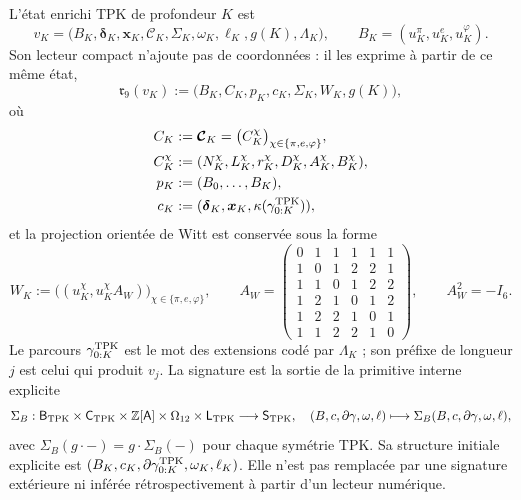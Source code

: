 \begin{definition}
\label{def:continuo-comun-lector-compacto-nonadico}
L'état enrichi TPK de profondeur \(K\) est
\begin{equation}
\label{eq:continuo-comun-estado-tpk-completo}
 v_K=
 \bigl(
 B_K,\boldsymbol\delta_K,\boldsymbol x_K,
 \boldsymbol{\mathcal C}_K,\Sigma_K,
 \omega_K,\ell_K,g(K),\Lambda_K
 \bigr),
 \qquad
 B_K=(u_K^\pi,u_K^e,u_K^\varphi).
\end{equation}
Son lecteur compact n'ajoute pas de coordonnées : il les exprime à partir de ce même état,
\begin{equation}
\label{eq:continuo-comun-lector-compacto-nonadico}
 \mathfrak r_9(v_K)
 :=\bigl(B_K,C_K,p_K,c_K,\Sigma_K,W_K,g(K)\bigr),
\end{equation}
où
\begin{equation}
\label{eq:continuo-comun-lector-compacto-componentes}
\begin{aligned}
 C_K&:=\boldsymbol{\mathcal C}_K
      =\bigl(C_K^\chi\bigr)_{\chi\in\{\pi,e,\varphi\}},\\
 C_K^\chi&:=(N_K^\chi,L_K^\chi,r_K^\chi,
             D_K^\chi,A_K^\chi,B_K^\chi),\\
 p_K&:=(B_0,\ldots,B_K),\\
 c_K&:=(\boldsymbol\delta_K,\boldsymbol x_K,
       \kappa(\gamma^{\rm TPK}_{0:K})),
\end{aligned}
\end{equation}
et la projection orientée de Witt est conservée sous la forme
\begin{equation}
\label{eq:continuo-comun-sombra-witt}
 W_K:=
 \bigl((u_K^\chi,u_K^\chi A_W)\bigr)_
       {\chi\in\{\pi,e,\varphi\}},
 \qquad
 A_W=
 \begin{pmatrix}
 0&1&1&1&1&1\\
 1&0&1&2&2&1\\
 1&1&0&1&2&2\\
 1&2&1&0&1&2\\
 1&2&2&1&0&1\\
 1&1&2&2&1&0
 \end{pmatrix},
 \qquad A_W^2=-I_6.
\end{equation}
Le parcours \(\gamma^{\rm TPK}_{0:K}\) est le mot des extensions codé par \(\Lambda_K\) ; son préfixe de longueur \(j\) est celui qui produit \(v_j\). La signature est la sortie de la primitive interne explicite
\begin{equation}
\label{eq:continuo-comun-primitiva-firma-tpk}
 \Sigma_B:
 \mathsf B_{\rm TPK}\times\mathsf C_{\rm TPK}
 \times\mathbb Z[\mathsf A]\times\Omega_{12}\times\mathsf L_{\rm TPK}
 \longrightarrow\mathsf S_{\rm TPK},
 \quad
 (B,c,\partial\gamma,\omega,\ell)\longmapsto
 \Sigma_B(B,c,\partial\gamma,\omega,\ell),
\end{equation}
avec \(\Sigma_B(g\cdot-)=g\cdot\Sigma_B(-)\) pour chaque symétrie TPK. Sa structure initiale explicite est \((B_K,c_K,\partial\gamma^{\rm TPK}_{0:K},\omega_K,\ell_K)\). Elle n'est pas remplacée par une signature extérieure ni inférée rétrospectivement à partir d'un lecteur numérique.
\end{definition}

